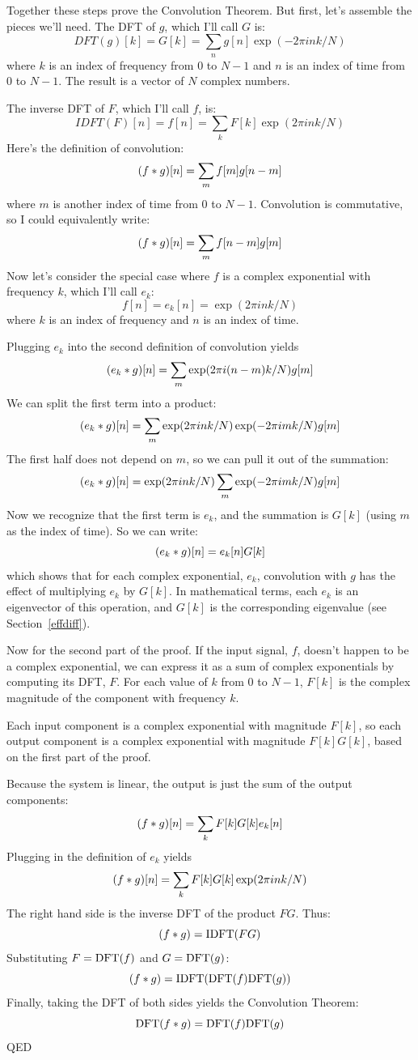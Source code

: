 \documentclass[12pt]{book}
\begin{document}
Together these steps prove the Convolution Theorem.  But first, let's
assemble the pieces we'll need.  The DFT of $g$, which I'll call $G$
is:
%
\[ DFT(g)[k] = G[k] = \sum_n g[n] \exp(-2 \pi i n k / N) \]
%
where $k$ is an index of frequency from
0 to $N-1$ and $n$ is an index of time from 0 to $N-1$.
The result is a vector of $N$ complex numbers.

The inverse DFT of $F$, which I'll call $f$, is:
%
\[ IDFT(F)[n] = f[n] = \sum_k F[k] \exp(2 \pi i n k / N) \]
%
Here's the definition of convolution:
%
\[ (f \ast g)[n] = \sum_m f[m] g[n-m] \]
%
where $m$ is another index of time from 0 to $N-1$.
Convolution is commutative, so I could equivalently write:
%
\[ (f \ast g)[n] = \sum_m f[n-m] g[m] \]
%
Now let's consider the special case where $f$ is a complex
exponential with frequency $k$, which I'll call $e_k$:
%
\[ f[n] = e_k[n] = \exp(2 \pi i n k / N) \]
%
where $k$ is an index of frequency and $n$ is an index of time.

Plugging $e_k$ into the second definition of convolution yields
%
\[ (e_k \ast g)[n] = \sum_m \exp(2 \pi i (n-m) k / N) g[m]  \]
%
We can split the first term into a product:
%
\[ (e_k \ast g)[n] = \sum_m \exp(2 \pi i n k / N) \exp(-2 \pi i m k / N) g[m]  \]
%
The first half does not depend on $m$, so we can pull it out of the
summation:
%
\[ (e_k \ast g)[n] = \exp(2 \pi i n k / N) \sum_m \exp(-2 \pi i m k / N) g[m]  \]
%
Now we recognize that the first term is $e_k$, and the summation is
$G[k]$ (using $m$ as the index of time).  So we can write:
%
\[ (e_k \ast g)[n] = e_k[n] G[k] \]
%
which shows that for each complex exponential, $e_k$, convolution
with $g$ has the effect of multiplying $e_k$ by $G[k]$.  In mathematical
terms, each $e_k$ is an eigenvector of this operation, and
$G[k]$ is the corresponding eigenvalue (see Section~\ref{effdiff}).

Now for the second part of the proof.  If the input signal, $f$, doesn't
happen to be a complex exponential, we can express it as a sum of
complex exponentials by computing its DFT, $F$.
For each value of $k$ from 0 to $N-1$, $F[k]$ is the complex
magnitude of the component with frequency $k$.

Each input component is a complex exponential with magnitude
$F[k]$, so each output component is a complex
exponential with magnitude $F[k] G[k]$, based on the first part of
the proof.

Because the system is linear, the output is just the sum of the
output components:
%
\[ (f \ast g)[n] = \sum_k F[k] G[k] e_k[n] \]
%
Plugging in the definition of $e_k$ yields
%
\[ (f \ast g)[n] = \sum_k F[k] G[k] \exp(2 \pi i n k / N) \]
%
The right hand side is the inverse DFT of the product $F G$.  Thus:
%
\[ (f \ast g) = \mathrm{IDFT}( F G ) \]
%
Substituting $F = \mathrm{DFT}(f)$ and $G = \mathrm{DFT}(g)$:
%
\[ (f \ast g) = \mathrm{IDFT}( \mathrm{DFT}(f) \mathrm{DFT}(g) ) \]
%
Finally, taking the DFT of both sides yields the Convolution Theorem:
%
\[ \mathrm{DFT}(f \ast g) = \mathrm{DFT}(f) \mathrm{DFT}(g) \]
%
QED
\end{document}
